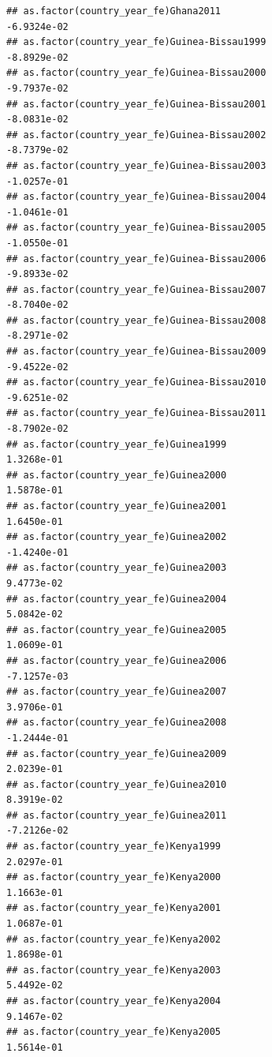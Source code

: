 \documentclass[
  a4paper,
]{article}
\begin{document}
\begin{verbatim}
## as.factor(country_year_fe)Ghana2011                            -6.9324e-02
## as.factor(country_year_fe)Guinea-Bissau1999                    -8.8929e-02
## as.factor(country_year_fe)Guinea-Bissau2000                    -9.7937e-02
## as.factor(country_year_fe)Guinea-Bissau2001                    -8.0831e-02
## as.factor(country_year_fe)Guinea-Bissau2002                    -8.7379e-02
## as.factor(country_year_fe)Guinea-Bissau2003                    -1.0257e-01
## as.factor(country_year_fe)Guinea-Bissau2004                    -1.0461e-01
## as.factor(country_year_fe)Guinea-Bissau2005                    -1.0550e-01
## as.factor(country_year_fe)Guinea-Bissau2006                    -9.8933e-02
## as.factor(country_year_fe)Guinea-Bissau2007                    -8.7040e-02
## as.factor(country_year_fe)Guinea-Bissau2008                    -8.2971e-02
## as.factor(country_year_fe)Guinea-Bissau2009                    -9.4522e-02
## as.factor(country_year_fe)Guinea-Bissau2010                    -9.6251e-02
## as.factor(country_year_fe)Guinea-Bissau2011                    -8.7902e-02
## as.factor(country_year_fe)Guinea1999                            1.3268e-01
## as.factor(country_year_fe)Guinea2000                            1.5878e-01
## as.factor(country_year_fe)Guinea2001                            1.6450e-01
## as.factor(country_year_fe)Guinea2002                           -1.4240e-01
## as.factor(country_year_fe)Guinea2003                            9.4773e-02
## as.factor(country_year_fe)Guinea2004                            5.0842e-02
## as.factor(country_year_fe)Guinea2005                            1.0609e-01
## as.factor(country_year_fe)Guinea2006                           -7.1257e-03
## as.factor(country_year_fe)Guinea2007                            3.9706e-01
## as.factor(country_year_fe)Guinea2008                           -1.2444e-01
## as.factor(country_year_fe)Guinea2009                            2.0239e-01
## as.factor(country_year_fe)Guinea2010                            8.3919e-02
## as.factor(country_year_fe)Guinea2011                           -7.2126e-02
## as.factor(country_year_fe)Kenya1999                             2.0297e-01
## as.factor(country_year_fe)Kenya2000                             1.1663e-01
## as.factor(country_year_fe)Kenya2001                             1.0687e-01
## as.factor(country_year_fe)Kenya2002                             1.8698e-01
## as.factor(country_year_fe)Kenya2003                             5.4492e-02
## as.factor(country_year_fe)Kenya2004                             9.1467e-02
## as.factor(country_year_fe)Kenya2005                             1.5614e-01

\end{verbatim}
\end{document}
